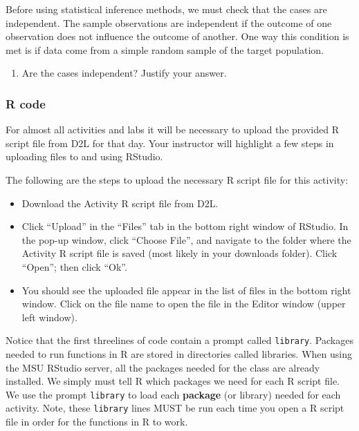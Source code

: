 \documentclass[
]{report}
\providecommand{\tightlist}{%
  \setlength{\itemsep}{0pt}\setlength{\parskip}{0pt}}
\begin{document}
Before using statistical inference methods, we must check that the cases are independent. The sample observations are independent if the outcome of one observation does not influence the outcome of another. One way this condition is met is if data come from a simple random sample of the target population.

\begin{enumerate}
\def\labelenumi{\arabic{enumi}.}
\tightlist
\item
  Are the cases independent? Justify your answer.
\end{enumerate}

\vspace{0.8in}

\subsubsection*{R code}\label{r-code}

For almost all activities and labs it will be necessary to upload the provided R script file from D2L for that day. Your instructor will highlight a few steps in uploading files to and using RStudio.

The following are the steps to upload the necessary R script file for this activity:

\begin{itemize}
\item
  Download the Activity R script file from D2L.
\item
  Click ``Upload'' in the ``Files'' tab in the bottom right window of RStudio. In the pop-up window, click ``Choose File'', and navigate to the folder where the Activity R script file is saved (most likely in your downloads folder). Click ``Open''; then click ``Ok''.
\item
  You should see the uploaded file appear in the list of files in the bottom right window. Click on the file name to open the file in the Editor window (upper left window).
\end{itemize}

Notice that the first threelines of code contain a prompt called \texttt{library}. Packages needed to run functions in R are stored in directories called libraries. When using the MSU RStudio server, all the packages needed for the class are already installed. We simply must tell R which packages we need for each R script file. We use the prompt \texttt{library} to load each \textbf{package} (or library) needed for each activity. Note, these \texttt{library} lines MUST be run each time you open a R script file in order for the functions in R to work.
\end{document}
